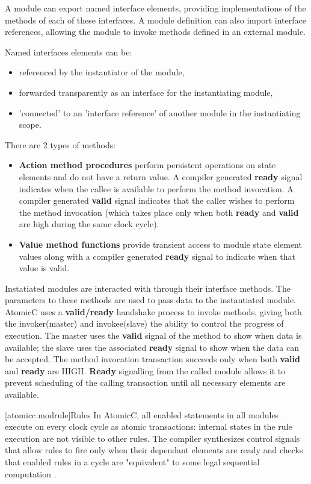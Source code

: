 A module can export named interface elements, providing implementations of
the methods of each of these interfaces.  A module definition can also import
interface references, allowing the module to invoke methods defined
in an external module.

Named interfaces elements can be:
\begin{itemize}
\item referenced by the instantiator of the module,
\item forwarded transparently as an interface for the instantiating module,
\item 'connected' to an 'interface reference' of another module in the instantiating scope.
\end{itemize}

There are 2 types of methods:
\begin{itemize}
\item \textbf{Action method procedures} perform persistent operations on state elements
and do not have a return value.  A compiler generated \textbf{ready} signal
indicates when the callee is available to perform the method invocation.  A compiler generated
\textbf{valid} signal indicates that the caller wishes to perform the method invocation (which
takes place only when both \textbf{ready} and \textbf{valid} are high during the same clock cycle).
\item \textbf{Value method functions} provide transient access to module state element values along
with a compiler generated \textbf{ready} signal to indicate when that value is valid.
\end{itemize}

Instatiated modules are interacted with through their interface methods.  The parameters
to these methods are used to pass data to the instantiated module.
AtomicC uses a \textbf{valid/ready} handshake process\cite{Fletcher2009, AXISpec} to invoke methods,
giving both the invoker(master) and invokee(slave) the ability to control the progress of execution.
The master uses the \textbf{valid} signal
of the method to show when data is available; the slave uses the associated
\textbf{ready} signal to show when the data can be accepted.
The method invocation transaction succeeds only when
both \textbf{valid} and \textbf{ready} are HIGH.
\textbf{Ready} signalling from the called module allows it to prevent
scheduling of the calling transaction until all necessary elements are
available.

[atomicc.modrule]{Rules}
In AtomicC, all enabled statements in all modules execute on every clock cycle
as atomic transactions: internal states in the rule
execution are not visible to other rules.
The compiler synthesizes control signals that allow rules to fire
only when their dependant elements are ready and checks that enabled
rules in a cycle are
"equivalent" to some legal sequential computation \cite{Lamport:1979:MMC:1311099.1311750}.

